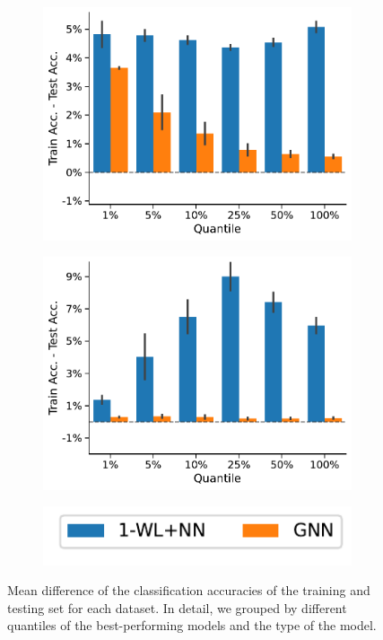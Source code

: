 \begin{figure}[htb]
\begin{subfigure}[b]{0.3\textwidth}
		\includegraphics[width=\textwidth]{Figures/train_test_diff_PROTEINS.pdf}
		\vspace*{-4ex} 
		\caption{\proteins}
	\end{subfigure}
	\hfill
	\begin{subfigure}[b]{0.3\textwidth}
		\centering
		\includegraphics[width=\textwidth]{Figures/train_test_diff_REDDIT-BINARY.pdf}
		\vspace*{-4ex} 
		\caption{\reddit}
	\end{subfigure}
	\centering
	\begin{subfigure}[b]{0.3\textwidth}
		\centering
		\includegraphics[width=\textwidth]{Figures/train_test_diff_legend.pdf}
		\vspace*{-4ex} 
	\end{subfigure}
	\caption{Mean difference of the classification accuracies of the training and testing set for each dataset. In detail, we grouped by different quantiles of the best-performing models and the type of the model.}
	\label{fig:performance_diff}
\end{figure}

